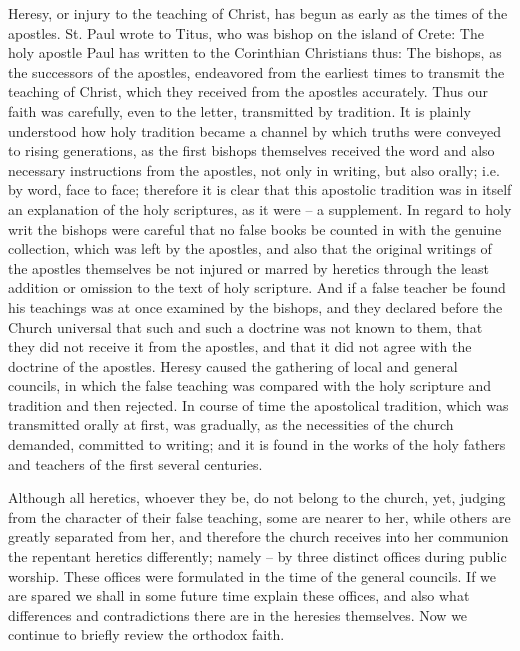 Heresy, or injury to the teaching of Christ, 
has begun as early as the times of the apostles. 
St. Paul wrote to Titus, who was bishop on the 
island of Crete:  The holy 
apostle Paul has written to the Corinthian 
Christians thus:  The bishops, as the successors of the 
apostles, endeavored from the earliest times to 
transmit the teaching of Christ, which they received
from the apostles accurately. Thus our 
faith was carefully, even to the letter, transmitted
by tradition. It is plainly understood 
how holy tradition became a channel by which 
truths were conveyed to rising generations, as 
the first bishops themselves received the word 
and also necessary instructions from the 
apostles, not only in writing, but also orally; 
i.e. by word, face to face; therefore it is clear 
that this apostolic tradition was in itself an explanation
of the holy scriptures, as it were -- a 
supplement. In regard to holy writ the bishops 
were careful that no false books be counted in 
with the genuine collection, which was left by 
the apostles, and also that the original writings 
of the apostles themselves be not injured or 
marred by heretics through the least addition or 
omission to the text of holy scripture. And 
if a false teacher be found his teachings was at
once examined by the bishops, and they declared
before the Church universal that such and 
such a doctrine was not known to them, that 
they did not receive it from the apostles, and 
that it did not agree with the doctrine of the 
apostles. Heresy caused the gathering of local 
and general councils, in which the false teaching
was compared with the holy scripture and 
tradition and then rejected. In course of time 
the apostolical tradition, which was transmitted 
orally at first, was gradually, as the necessities 
of the church demanded, committed to writing; 
and it is found in the works of the holy fathers 
and teachers of the first several centuries. 

Although all heretics, whoever they be, do not 
belong to the church, yet, judging from the 
character of their false teaching, some are nearer 
to her, while others are greatly separated from 
her, and therefore the church receives into her 
communion the repentant heretics differently; 
namely -- by three distinct offices during public 
worship. These offices were formulated in the 
time of the general councils. If we are spared 
we shall in some future time explain these offices,
and also what differences and contradictions
there are in the heresies themselves. Now 
we continue to briefly review the orthodox faith.

